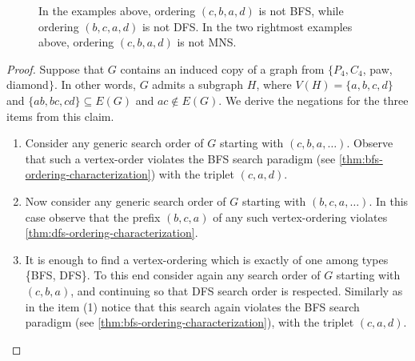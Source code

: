 \documentclass{svproc}
\begin{document}
\begin{figure}[t]
\caption{In the examples above, ordering $(c,b,a,d)$ is not BFS, while ordering $(b,c,a,d)$ is not DFS. In the two rightmost examples above, ordering $(c,b,a,d)$ is not MNS. }
\label{fig:BFSnotLBFS}
\end{figure}
\begin{proof}
Suppose that $G$ contains an induced copy of a graph from $\{P_4, C_4$, paw, diamond$\}$. In other words, $G$ admits a subgraph $H$, where  
$V(H)=\{a,b,c,d\}$ and $\{ab,bc,cd\}\subseteq E(G)$ and $ac\notin E(G)$.
We derive the negations for the three items from this claim.
\begin{enumerate}
    \item Consider any generic search order of $G$ starting with $(c,b,a,\dots)$. Observe that such a vertex-order violates the BFS search paradigm (see \cref{thm:bfs-ordering-characterization}) with the triplet $(c,a,d)$.
    \item Now consider any generic search order of $G$ starting with $(b,c,a,\dots)$. In this case observe that the prefix $(b,c,a)$ of any such vertex-ordering violates \cref{thm:dfs-ordering-characterization}.
    \item It is enough to find a vertex-ordering which is exactly of one among types \{BFS, DFS\}. To this end consider again any search order of $G$ starting with $(c,b,a)$, and continuing so that DFS search order is respected. Similarly as in the item (1) notice that this search again violates the BFS search paradigm (see \cref{thm:bfs-ordering-characterization}), 
    with the triplet $(c,a,d)$.
\end{enumerate}
\end{proof}
\end{document}

